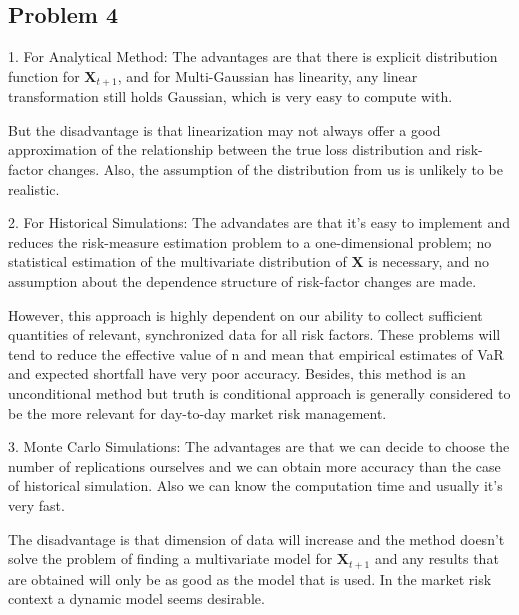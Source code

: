 \documentclass[letterpaper,11pt]{article}
\begin{document}
\begin{spacing}{1.2}
\section*{Problem 4}
1. For Analytical Method: The advantages are that there is explicit distribution function for $\bm{X}_{t+1}$, and for Multi-Gaussian has linearity, any linear transformation still holds Gaussian, which is very easy to compute with.

But the disadvantage is that linearization may not always offer a good approximation of the relationship between the true loss distribution and risk-factor changes. Also, the assumption of the distribution from us is unlikely to be realistic.

2. For Historical Simulations: The advandates are that it's easy to implement and reduces the risk-measure estimation problem to a one-dimensional problem; no statistical estimation of the multivariate distribution of $\bm{X}$ is necessary, and no assumption about the dependence structure of risk-factor changes are made.

However, this approach is highly dependent on our ability to collect sufficient quantities of relevant, synchronized data for all risk factors. These problems will tend to reduce the effective value of n and mean that empirical estimates of VaR and expected shortfall have very poor accuracy. Besides, this method is an unconditional method but truth is conditional approach is generally considered to be the more relevant for day-to-day market risk management.

3. Monte Carlo Simulations: The advantages are that we can decide to choose the number of replications ourselves and we can obtain more accuracy than the case of historical simulation. Also we can know the computation time and usually it's very fast.

The disadvantage is that dimension of data will increase and the method doesn't solve the problem of finding a multivariate model for $\bm{X}_{t+1}$ and any results that are obtained will only be as good as the model that is used. In the market risk context a dynamic model seems desirable.

\end{spacing}
\end{document}
